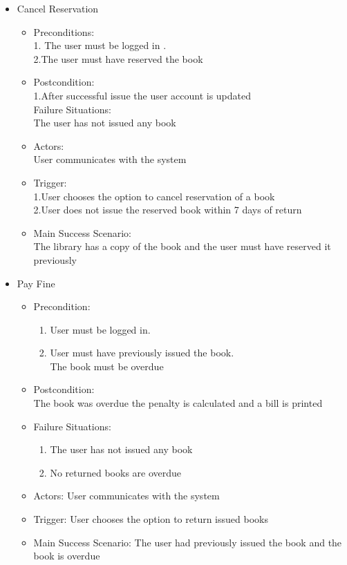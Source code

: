 \documentclass[a4paper]{article}
\begin{document}
\begin{enumerate}
\begin{itemize}
 \item Cancel Reservation\\
 \begin{itemize}
 \item  Preconditions:\\
 1. The user must be logged in .\\
 2.The user must have reserved the book\\
 \item Postcondition:\\
 1.After successful issue the user account is updated \\
Failure Situations:\\The user has not issued any book\\
 \item Actors: \\User communicates with the system\\
 \item Trigger:\\ 
 1.User chooses the option to cancel reservation of a book \\
 2.User does not issue the reserved book within 7 days of return\\
 \item Main Success Scenario:\\ The library has a copy of the book and the user must have reserved it previously\\
	
 \end{itemize}

\item Pay Fine\\
	\begin{itemize}
	\item  Precondition:\\
	\begin{enumerate}	
	\item User must be logged in.\\
	\item User must have previously issued the book.\\The book must be overdue\\
	\end{enumerate}
 \item Postcondition:\\
  The book was overdue the penalty is calculated and a bill is printed 
 \item Failure Situations:
 \begin{enumerate}
 \item The user has not issued any book
  \item No returned books are overdue
	\end{enumerate} 
 \item Actors: User communicates with the system
 \item Trigger: User chooses the option to return issued books
 \item Main Success Scenario: The user had previously issued the book and the book is overdue
	\end{itemize}
\end{itemize}



\end{enumerate}
\end{document}
